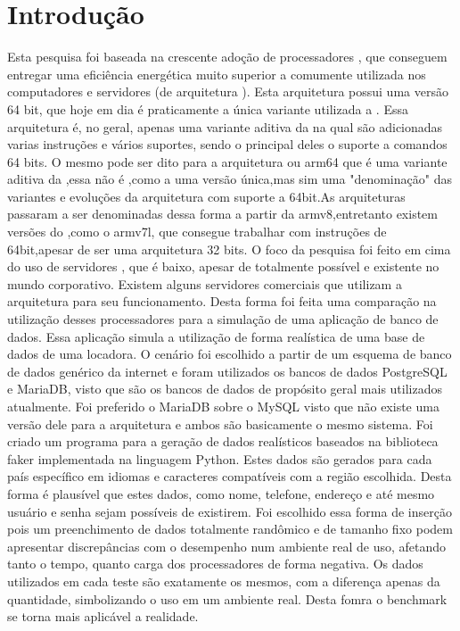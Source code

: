 \documentclass[
	12pt,				%
	openright,			%
	oneside,			%
	a4paper,			%
	english,			%
	french,				%
	spanish,			%
	brazil,				%
	]{abntex2}
\begin{document}
\chapter*{Introdução}
\label{ch:introducao}
Esta pesquisa foi baseada na crescente adoção de processadores , que conseguem entregar uma eficiência energética muito superior a comumente utilizada nos computadores e servidores (de arquitetura ). Esta arquitetura possui uma versão 64 bit, que hoje em dia é praticamente a única variante utilizada a . Essa arquitetura é, no geral, apenas uma variante aditiva da  na qual são adicionadas varias instruções e vários suportes, sendo o principal deles o suporte a comandos 64 bits. O mesmo pode ser dito para a arquitetura  ou arm64 que é uma variante aditiva da ,essa não é ,como a  uma versão única,mas sim uma "denominação" das variantes e evoluções da arquitetura  com suporte a 64bit.As arquiteturas passaram a ser denominadas dessa forma a partir da armv8,entretanto existem versões do ,como o armv7l, que consegue trabalhar com instruções de 64bit,apesar de ser uma arquitetura 32 bits.\newline
O foco da pesquisa foi feito em cima do uso de servidores , que é baixo, apesar de totalmente possível e existente no mundo corporativo. Existem alguns servidores comerciais que utilizam a arquitetura  para seu funcionamento. Desta forma foi feita uma comparação na utilização desses processadores para a simulação de uma aplicação de banco de dados. Essa aplicação simula a utilização de forma realística de uma base de dados de uma locadora. \newline
O cenário foi escolhido a partir de um esquema de banco de dados genérico da internet e foram utilizados os bancos de dados PostgreSQL e MariaDB, visto que são os bancos de dados de propósito geral mais utilizados atualmente. Foi preferido o MariaDB sobre o MySQL visto que não existe uma versão dele para a arquitetura  e ambos são basicamente o mesmo sistema.\newline
Foi criado um programa para a geração de dados realísticos baseados na biblioteca faker implementada na linguagem Python. Estes dados são gerados para cada país específico em idiomas e caracteres compatíveis com a região escolhida. Desta forma é plausível que estes dados, como nome, telefone, endereço e até mesmo usuário e senha sejam possíveis de existirem. Foi escolhido essa forma de inserção pois um preenchimento de dados totalmente randômico e de tamanho fixo podem apresentar discrepâncias com o desempenho num ambiente real de uso, afetando tanto o tempo, quanto carga dos processadores de forma negativa. Os dados utilizados em cada teste são exatamente os mesmos, com a diferença apenas da quantidade, simbolizando o uso em um ambiente real. Desta fomra o benchmark se torna mais aplicável a realidade.\newline
\end{document}

